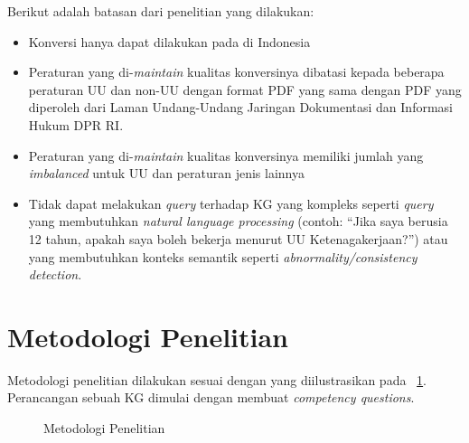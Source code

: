 Berikut adalah batasan dari penelitian yang dilakukan:
\begin{itemize}
  \item Konversi hanya dapat dilakukan pada \legal di Indonesia
  \item Peraturan yang di-\textit{maintain} kualitas konversinya dibatasi kepada beberapa peraturan
        UU dan non-UU dengan format PDF yang sama dengan PDF yang diperoleh dari Laman Undang-Undang Jaringan
Dokumentasi dan Informasi Hukum DPR RI.
  \item Peraturan yang di-\textit{maintain} kualitas konversinya memiliki jumlah yang
        \textit{imbalanced} untuk UU dan peraturan jenis lainnya
  \item Tidak dapat melakukan \textit{query} terhadap KG yang kompleks seperti \textit{query} yang
        membutuhkan \textit{natural language processing} (contoh: ``Jika saya berusia 12 tahun,
        apakah saya boleh bekerja menurut UU Ketenagakerjaan?'') atau yang membutuhkan konteks
        semantik seperti \textit{abnormality/consistency detection}.
\end{itemize}

\section{Metodologi Penelitian}
\label{sec:metodologi-penelitian}

Metodologi penelitian dilakukan sesuai dengan yang diilustrasikan pada \pic~\ref{fig:metodologi}.
Perancangan sebuah KG dimulai dengan membuat \textit{competency questions}.


\begin{figure}
  \centering
  \caption{Metodologi Penelitian}
  \label{fig:metodologi}
\end{figure}

